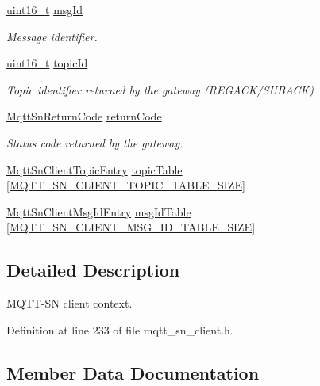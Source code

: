 \begin{DoxyCompactItemize}
\hyperlink{stdint_8h_a273cf69d639a59973b6019625df33e30}{uint16\+\_\+t} \hyperlink{struct__MqttSnClientContext_a185b24e859e94aaeaf89537d6f284e9c}{msg\+Id}
\begin{DoxyCompactList}\small\item\em Message identifier. \end{DoxyCompactList}\item 
\hyperlink{stdint_8h_a273cf69d639a59973b6019625df33e30}{uint16\+\_\+t} \hyperlink{struct__MqttSnClientContext_ad9ac60b5935e7188c14ad6b4a16797ce}{topic\+Id}
\begin{DoxyCompactList}\small\item\em Topic identifier returned by the gateway (R\+E\+G\+A\+C\+K/\+S\+U\+B\+A\+CK) \end{DoxyCompactList}\item 
\hyperlink{mqtt__sn__common_8h_aa8ae09a48836472262f42c1f09638e9c}{Mqtt\+Sn\+Return\+Code} \hyperlink{struct__MqttSnClientContext_a2b7c1f8b3a1e310bea467cea66e106bb}{return\+Code}
\begin{DoxyCompactList}\small\item\em Status code returned by the gateway. \end{DoxyCompactList}\item 
\hyperlink{structMqttSnClientTopicEntry}{Mqtt\+Sn\+Client\+Topic\+Entry} \hyperlink{struct__MqttSnClientContext_a28ff5de9226e93950ca2c860609792ae}{topic\+Table} \mbox{[}\hyperlink{mqtt__sn__client_8h_a5b09bca70606bc04d0c7ae24e2319f75}{M\+Q\+T\+T\+\_\+\+S\+N\+\_\+\+C\+L\+I\+E\+N\+T\+\_\+\+T\+O\+P\+I\+C\+\_\+\+T\+A\+B\+L\+E\+\_\+\+S\+I\+ZE}\mbox{]}
\item 
\hyperlink{structMqttSnClientMsgIdEntry}{Mqtt\+Sn\+Client\+Msg\+Id\+Entry} \hyperlink{struct__MqttSnClientContext_a70dc3314c5b9ff9adc1220029f80e7b0}{msg\+Id\+Table} \mbox{[}\hyperlink{mqtt__sn__client_8h_a720582816fcc2db4accc2fb95955c92c}{M\+Q\+T\+T\+\_\+\+S\+N\+\_\+\+C\+L\+I\+E\+N\+T\+\_\+\+M\+S\+G\+\_\+\+I\+D\+\_\+\+T\+A\+B\+L\+E\+\_\+\+S\+I\+ZE}\mbox{]}
\end{DoxyCompactItemize}


\subsection{Detailed Description}
M\+Q\+T\+T-\/\+SN client context. 

Definition at line 233 of file mqtt\+\_\+sn\+\_\+client.\+h.



\subsection{Member Data Documentation}
\mbox{\label{struct__MqttSnClientContext_a651887eae60b024cda3699b46f1efb38}} 
